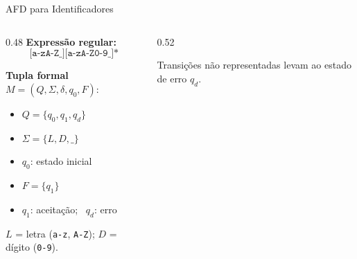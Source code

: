 \documentclass[aspectratio=169, 11pt]{beamer}
\begin{document}
\begin{frame}{AFD para Identificadores}

    \begin{columns}[T]
        \begin{column}{0.48\textwidth}
            \textbf{Expressão regular:}
            \[ \texttt{[a-zA-Z\_][a-zA-Z0-9\_]*} \]

            \textbf{Tupla formal} $M = (Q, \Sigma, \delta, q_0, F)$:
            \begin{itemize}
                \item $Q = \{q_0, q_1, q_d\}$
                \item $\Sigma = \{L, D, \_\}$
                \item $q_0$: estado inicial
                \item $F = \{q_1\}$
                \item $q_1$: aceitação; \ $q_d$: erro
            \end{itemize}

            {\small $L$ = letra (\texttt{a-z}, \texttt{A-Z}); \quad $D$ = dígito (\texttt{0-9}).}
        \end{column}

        \begin{column}{0.52\textwidth}
            \centering

            \vspace{0.4cm}
            {\small Transições não representadas levam ao estado de erro $q_d$.}
        \end{column}
    \end{columns}

\end{frame}
\end{document}
